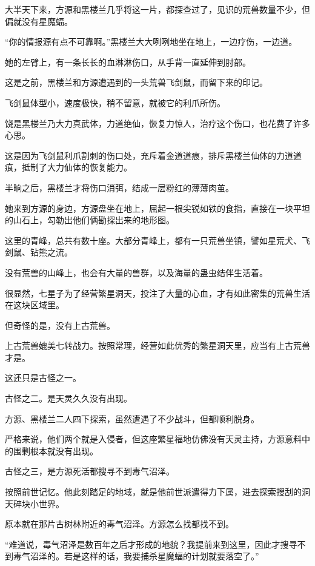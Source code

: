 
\begin{this_body}

大半天下来，方源和黑楼兰几乎将这一片，都探查过了，见识的荒兽数量不少，但偏就没有星魔蝠。

“你的情报源有点不可靠啊。”黑楼兰大大咧咧地坐在地上，一边疗伤，一边道。

她的左臂上，有一条长长的血淋淋伤口，从手背一直延伸到肘部。

这是之前，黑楼兰和方源遭遇到的一头荒兽飞剑鼠，而留下来的印记。

飞剑鼠体型小，速度极快，稍不留意，就被它的利爪所伤。

饶是黑楼兰乃大力真武体，力道绝仙，恢复力惊人，治疗这个伤口，也花费了许多心思。

这是因为飞剑鼠利爪割刺的伤口处，充斥着金道道痕，排斥黑楼兰仙体的力道道痕，抵制了大力仙体的恢复能力。

半晌之后，黑楼兰才将伤口消弭，结成一层粉红的薄薄肉茧。

她来到方源的身边，方源盘坐在地上，屈起一根尖锐如铁的食指，直接在一块平坦的山石上，勾勒出他们俩勘探出来的地形图。

这里的青峰，总共有数十座。大部分青峰上，都有一只荒兽坐镇，譬如星荒犬、飞剑鼠、钻熊之流。

没有荒兽的山峰上，也会有大量的兽群，以及海量的蛊虫结伴生活着。

很显然，七星子为了经营繁星洞天，投注了大量的心血，才有如此密集的荒兽生活在这块区域里。

但奇怪的是，没有上古荒兽。

上古荒兽媲美七转战力。按照常理，经营如此优秀的繁星洞天里，应当有上古荒兽才是。

这还只是古怪之一。

古怪之二。是天灵久久没有出现。

方源、黑楼兰二人四下探索，虽然遭遇了不少战斗，但都顺利脱身。

严格来说，他们两个就是入侵者，但这座繁星福地仿佛没有天灵主持，方源意料中的围剿根本就没有出现。

古怪之三，是方源死活都搜寻不到毒气沼泽。

按照前世记忆。他此刻踏足的地域，就是他前世派遣得力下属，进去探索搜刮的洞天碎块小世界。

原本就在那片古树林附近的毒气沼泽。方源怎么找都找不到。

“难道说，毒气沼泽是数百年之后才形成的地貌？我提前来到这里，因此才搜寻不到毒气沼泽的。若是这样的话，我要捕杀星魔蝠的计划就要落空了。”


\end{this_body}
